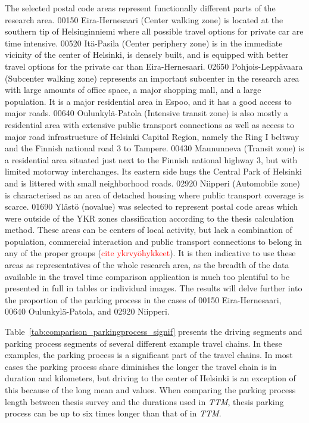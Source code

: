 The selected postal code areas represent functionally different parts of the research area. 00150 Eira-Hernesaari (Center walking zone) is located at the southern tip of Helsinginniemi where all possible travel options for private car are time intensive. 00520 Itä-Pasila (Center periphery zone) is in the immediate vicinity of the center of Helsinki, is densely built, and is equipped with better travel options for the private car than Eira-Hernesaari. 02650 Pohjois-Leppävaara (Subcenter walking zone) represents an important subcenter in the research area with large amounts of office space, a major shopping mall, and a large population. It is a major residential area in Espoo, and it has a good access to major roads. 00640 Oulunkylä-Patola (Intensive transit zone) is also mostly a residential area with extensive public transport connections as well as access to major road infrastructure of Helsinki Capital Region, namely the Ring I beltway and the Finnish national road 3 to Tampere. 00430 Maununneva (Transit zone) is a residential area situated just next to the Finnish national highway 3, but with limited motorway interchanges. Its eastern side hugs the Central Park of Helsinki and is littered with small neighborhood roads. 02920 Niipperi (Automobile zone) is characterised as an area of detached housing where public transport coverage is scarce. 01690 Ylästö (novalue) was selected to represent postal code areas which were outside of the YKR zones classification according to the thesis calculation method. These areas can be centers of local activity, but lack a combination of population, commercial interaction and public transport connections to belong in any of the proper  groups (\textcolor{red}{cite ykrvyöhykkeet}). It is then indicative to use these areas as representatives of the whole research area, as the breadth of the data available in the travel time comparison application is much too plentiful to be presented in full in tables or individual images. The results will delve further into the proportion of the parking process in the cases of 00150 Eira-Hernesaari, 00640 Oulunkylä-Patola, and 02920 Niipperi.

Table~\ref{tab:comparison_parkingprocess_signif} presents the driving segments and parking process segments of several different example travel chains. In these examples, the parking process is a significant part of the travel chains. In most cases the parking process share diminishes the longer the travel chain is in duration and kilometers, but driving to the center of Helsinki is an exception of this because of the long mean  and  values. When comparing the parking process length between thesis survey and the durations used in \textit{TTM}, thesis parking process can be up to six times longer than that of in \textit{TTM}.

